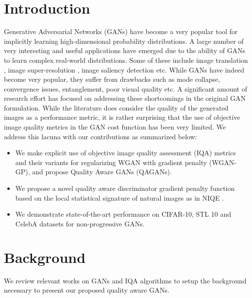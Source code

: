 \documentclass{article}
\begin{document}
\section{Introduction}
\label{sec:intro}
Generative Adversarial Networks (GANs) \cite{goodfellow2014generative} have become a very popular tool for implicitly learning high-dimensional probability distributions. A large number of very interesting and useful applications have emerged due to the ability of GANs to learn complex real-world distributions. Some of these include image translation \cite{isola2017image}, image super-resolution \cite{ledig2017photo}, image saliency detection \cite{pan2017salgan} etc. While GANs have indeed become very popular, they suffer from drawbacks such as mode collapse, convergence issues, entanglement, poor visual quality etc. A significant amount of research effort has focused on addressing these shortcomings in the original GAN formulation. While the literature does consider the quality of the generated images as a performance metric, it is rather surprising that the use of objective image quality metrics in the GAN cost function has been very limited. We address this lacuna with our contributions as summarized below:
\begin{itemize}
    \item {We make explicit use of objective image quality assessment (IQA) metrics and their variants for regularizing WGAN with gradient penalty (WGAN-GP), and propose Quality Aware GANs (QAGANs).}
    \item {We propose a novel quality aware discriminator gradient penalty function based on the local statistical signature of natural images as in NIQE \cite{mittal2013making}.}
    \item {We demonstrate state-of-the-art performance on CIFAR-10, STL 10 and CelebA datasets for non-progressive GANs.}
\end{itemize}

\section{Background}
\label{sec:background}
We review relevant works on GANs and IQA algorithms to setup the background necessary to present our proposed quality aware GANs. 
\end{document}

